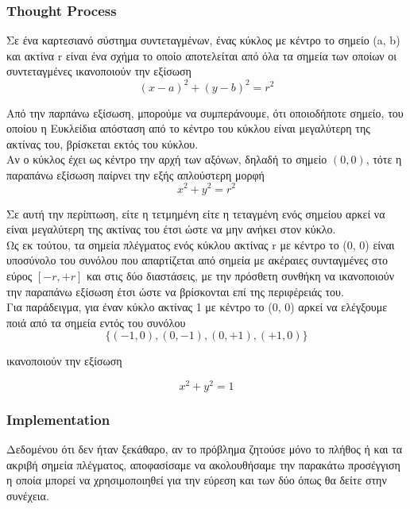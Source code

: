 \documentclass[12pt]{article}
\begin{document}
\subsubsection*{Thought Process}

Σε ένα καρτεσιανό σύστημα συντεταγμένων, ένας κύκλος με κέντρο το σημείο (a, b)
και ακτίνα r είναι ένα σχήμα το οποίο αποτελείται από όλα τα σημεία των οποίων
οι συντεταγμένες ικανοποιούν την εξίσωση \\

\[ (x - a) ^ 2 + (y - b) ^ 2 = r ^ 2 \]

Από την παρπάνω εξίσωση, μπορούμε να συμπεράνουμε,
ότι οποιοδήποτε σημείο, του οποίου η Ευκλείδια απόσταση από το κέντρο του κύκλου
είναι μεγαλύτερη της ακτίνας του, βρίσκεται εκτός του κύκλου. \\

Αν ο κύκλος έχει ως κέντρο την αρχή των αξόνων, δηλαδή το σημείο \( (0, 0) \), τότε
η παραπάνω εξίσωση παίρνει την εξής απλούστερη μορφή \\

\[ x ^ 2 + y ^ 2 = r ^ 2 \]

Σε αυτή την περίπτωση, είτε η τετμημένη είτε η τεταγμένη ενός σημείου
αρκεί να είναι μεγαλύτερη της ακτίνας του έτσι ώστε να μην ανήκει στον κύκλο. \\

Ως εκ τούτου, τα σημεία πλέγματος ενός κύκλου ακτίνας r με κέντρο το (0, 0)
είναι υποσύνολο του συνόλου που απαρτίζεται από σημεία με ακέραιες συνταγμένες
στο εύρος \( [-r, +r] \) και στις δύο διαστάσεις, με την πρόσθετη συνθήκη
να ικανοποιούν την παραπάνω εξίσωση έτσι ώστε να βρίσκονται επί της
περιφέρειάς του. \\

Για παράδειγμα, για έναν κύκλο ακτίνας 1 με κέντρο το (0, 0) αρκεί να
ελέγξουμε ποιά από τα σημεία εντός του συνόλου \\

\[ \{ (-1, 0), (0, -1), (0, +1), (+1, 0) \} \]

ικανοποιούν την εξίσωση

\[ x^2 + y^2 = 1 \]

\pagebreak

\subsubsection*{Implementation}

Δεδομένου ότι δεν ήταν ξεκάθαρο, αν το πρόβλημα ζητούσε μόνο
το πλήθος ή και τα ακριβή σημεία πλέγματος,
αποφασίσαμε να ακολουθήσαμε την παρακάτω προσέγγιση η οποία μπορεί να
χρησιμοποιηθεί για την εύρεση και των δύο όπως θα δείτε
στην συνέχεια. \\
\end{document}
